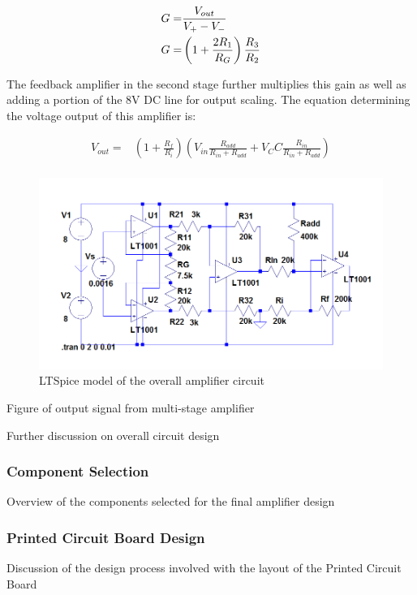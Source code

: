\begin{align}
	G =& \frac{V_{out}}{V_+ - V_-}\notag\\
	G =& \left(1+ \frac{2R_1}{R_G}\right)\frac{R_3}{R_2}
\end{align}

The feedback amplifier in the second stage further multiplies this gain as well as adding a portion of the 8V DC line for output scaling. The equation determining the voltage output of this amplifier is:

\begin{align}
	V_{out} =& \left(1+\frac{R_f}{R_i}\right)\left(V_{in}\frac{R_{add}}{R_{in} + R_{add}} + V_CC\frac{R_{in}}{R_{in} + R_{add}}\right)\\
\end{align}

\begin{figure}[h!]
	\centering
	\includegraphics[width=\textwidth]{Images/Strain_Gauges/IMG_SG_CircuitDesign.png}
	\caption{LTSpice model of the overall amplifier circuit}
	\label{fig:IMG_SG_CicuitDesign}
\end{figure}

Figure of output signal from multi-stage amplifier

Further discussion on overall circuit design

\subsubsection{Component Selection}
Overview of the components selected for the final amplifier design

\subsubsection{Printed Circuit Board Design}
Discussion of the design process involved with the layout of the Printed Circuit Board

